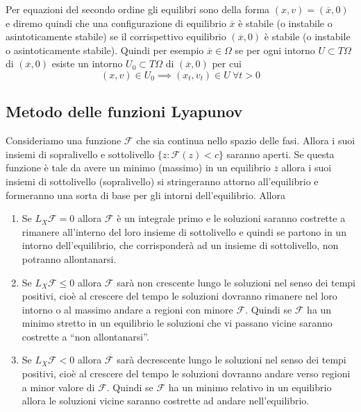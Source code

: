 \documentclass[11pt,a4paper,twoside]{book}
\theoremstyle{esss}
\theoremstyle{dotless}
\numberwithin{equation}{section} %
\begin{document}
Per equazioni del secondo ordine gli equilibri sono della forma $(x,v)=(\overline{x},0)$ e diremo quindi che una configurazione di equilibrio $\overline{x}$ è stabile (o instabile o asintoticamente stabile) se il corrispettivo equilibrio $(\overline{x},0)$ è stabile (o instabile o asintoticamente stabile).
Quindi per esempio $\overline{x}\in\Omega$ se per ogni intorno $U\subset T\Omega$ di $(\overline{x},0)$ esiste un intorno $U_0\subset T\Omega $ di $(\overline{x},0)$ per cui
\[
(x,v)\in U_0 \implies (x_t,v_t)\in U \> \forall t>0 
\]



\subsection{Metodo delle funzioni Lyapunov}

Consideriamo una funzione $\mathcal{F}$ che sia continua nello spazio delle fasi. Allora i suoi insiemi di sopralivello e sottolivello $\{z:\mathcal{F}(z)<c\}$ saranno aperti. Se questa funzione è tale da avere un minimo (massimo) in un equilibrio $\overline{z}$ allora i suoi insiemi di sottolivello (sopralivello) si stringeranno attorno all'equilibrio e formeranno una sorta di base per gli intorni dell'equilibrio. Allora
\begin{enumerate}
\item Se $L_X\mathcal{F}=0$ allora $\mathcal{F}$ è un integrale primo e le soluzioni saranno costrette a rimanere all'interno del loro insieme di sottolivello e quindi se partono in un intorno dell'equilibrio, che corrisponderà ad un insieme di sottolivello, non potranno allontanarsi.
\item Se $L_X\mathcal{F}\leq 0$ allora $\mathcal{F}$ sarà non crescente lungo le soluzioni nel senso dei tempi positivi, cioè al crescere del tempo le soluzioni dovranno rimanere nel loro intorno o al massimo andare a regioni con minore $\mathcal{F}$. Quindi se $\mathcal{F}$ ha un minimo stretto in un equilibrio le soluzioni che vi passano vicine saranno costrette a ``non allontanarsi''.
\item Se $L_X\mathcal{F} < 0$ allora $\mathcal{F}$ sarà decrescente lungo le soluzioni nel senso dei tempi positivi, cioè al crescere del tempo le soluzioni dovranno andare verso regioni a minor valore di $\mathcal{F}$. Quindi se $\mathcal{F}$ ha un minimo relativo in un equilibrio allora le soluzioni vicine saranno costrette ad andare nell'equilibrio.
\end{enumerate}
\end{document}
